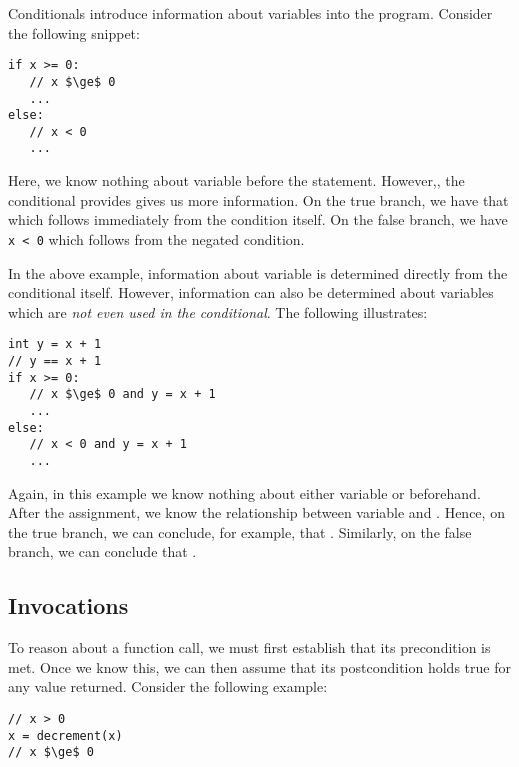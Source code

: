 Conditionals introduce information about variables into the program.  Consider the following snippet:

\begin{tcolorbox}\begin{lstlisting}[language=Whiley]
if x >= 0:
   // x $\ge$ 0
   ...
else:
   // x < 0
   ...
\end{lstlisting}\end{tcolorbox}

Here, we know nothing about variable  before the statement.  However,, the conditional provides gives us more information.  On the true branch, we have that  which follows immediately from the condition itself.  On the false branch, we have \lstinline{x < 0} which follows from the negated condition.

In the above example, information about variable  is determined directly from the conditional itself.  However, information can also be determined about variables which are {\em not even used in the conditional}.  The following illustrates:

\begin{tcolorbox}\begin{lstlisting}[language=Whiley]
int y = x + 1
// y == x + 1
if x >= 0:
   // x $\ge$ 0 and y = x + 1
   ...
else:
   // x < 0 and y = x + 1
   ...
\end{lstlisting}\end{tcolorbox}

Again, in this example we know nothing about either variable  or  beforehand.  After the assignment, we know the relationship between variable  and .  Hence, on the true branch, we can conclude, for example, that .  Similarly, on the false branch, we can conclude that .

\subsection{Invocations}

To reason about a function call, we must first establish that its precondition is met.  Once we know this, we can then assume that its postcondition holds true for any value returned.  Consider the following example:

\begin{tcolorbox}\begin{lstlisting}[language=Whiley]
// x > 0
x = decrement(x)
// x $\ge$ 0
\end{lstlisting}\end{tcolorbox}

